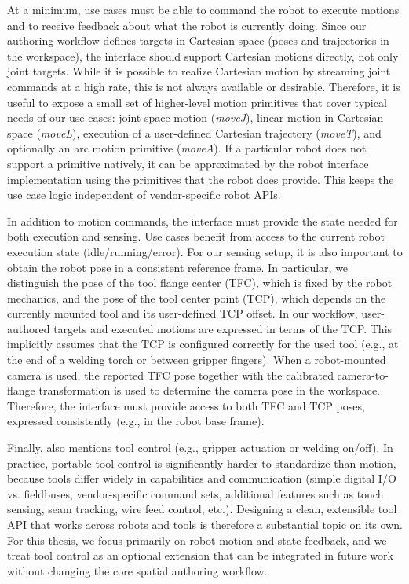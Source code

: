 At a minimum, use cases must be able to command the robot to execute motions and to receive feedback about what the robot is currently doing. Since our authoring workflow defines targets in Cartesian space (poses and trajectories in the workspace), the interface should support Cartesian motions directly, not only joint targets. While it is possible to realize Cartesian motion by streaming joint commands at a high rate, this is not always available or desirable. Therefore, it is useful to expose a small set of higher-level motion primitives that cover typical needs of our use cases: joint-space motion (\emph{moveJ}), linear motion in Cartesian space (\emph{moveL}), execution of a user-defined Cartesian trajectory (\emph{moveT}), and optionally an arc motion primitive (\emph{moveA}). If a particular robot does not support a primitive natively, it can be approximated by the robot interface implementation using the primitives that the robot does provide. This keeps the use case logic independent of vendor-specific robot APIs.

In addition to motion commands, the interface must provide the state needed for both execution and sensing. Use cases benefit from access to the current robot execution state (idle/running/error). For our sensing setup, it is also important to obtain the robot pose in a consistent reference frame. In particular, we distinguish the pose of the tool flange center (TFC), which is fixed by the robot mechanics, and the pose of the tool center point (TCP), which depends on the currently mounted tool and its user-defined TCP offset. In our workflow, user-authored targets and executed motions are expressed in terms of the TCP. This implicitly assumes that the TCP is configured correctly for the used tool (e.g., at the end of a welding torch or between gripper fingers). When a robot-mounted camera is used, the reported TFC pose together with the calibrated camera-to-flange transformation is used to determine the camera pose in the workspace. Therefore, the interface must provide access to both TFC and TCP poses, expressed consistently (e.g., in the robot base frame).

Finally,  also mentions tool control (e.g., gripper actuation or welding on/off). In practice, portable tool control is significantly harder to standardize than motion, because tools differ widely in capabilities and communication (simple digital I/O vs. fieldbuses, vendor-specific command sets, additional features such as touch sensing, seam tracking, wire feed control, etc.). Designing a clean, extensible tool API that works across robots and tools is therefore a substantial topic on its own. For this thesis, we focus primarily on robot motion and state feedback, and we treat tool control as an optional extension that can be integrated in future work without changing the core spatial authoring workflow.

